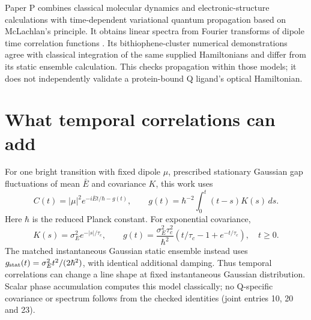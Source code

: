 \documentclass{article}
\begin{document}
Paper P combines classical molecular dynamics and electronic-structure calculations with time-dependent variational quantum propagation based on McLachlan's principle. It obtains linear spectra from Fourier transforms of dipole time correlation functions \cite{P}. Its bithiophene-cluster numerical demonstrations agree with classical integration of the same supplied Hamiltonians and differ from its static ensemble calculation. This checks propagation within those models; it does not independently validate a protein-bound Q ligand's optical Hamiltonian.

\section{What temporal correlations can add}

For one bright transition with fixed dipole \(\mu\), prescribed stationary Gaussian gap fluctuations of mean \(\bar E\) and covariance \(K\), this work uses
\[
 C(t)=|\mu|^2e^{-i\bar E t/\hbar-g(t)},\qquad
 g(t)=\hbar^{-2}\int_0^t(t-s)K(s)\,ds.
\]
Here \(\hbar\) is the reduced Planck constant. For exponential covariance,
\[
 K(s)=\sigma_E^2e^{-|s|/\tau_c},\qquad
 g(t)=\frac{\sigma_E^2\tau_c^2}{\hbar^2}
 \left(t/\tau_c-1+e^{-t/\tau_c}\right),\quad t\geq0.
\]
The matched instantaneous Gaussian static ensemble instead uses \(g_{\rm stat}(t)=\sigma_E^2t^2/(2\hbar^2)\), with identical additional damping. Thus temporal correlations can change a line shape at fixed instantaneous Gaussian distribution. Scalar phase accumulation computes this model classically; no Q-specific covariance or spectrum follows from the checked identities (joint entries 10, 20 and 23).
\end{document}
